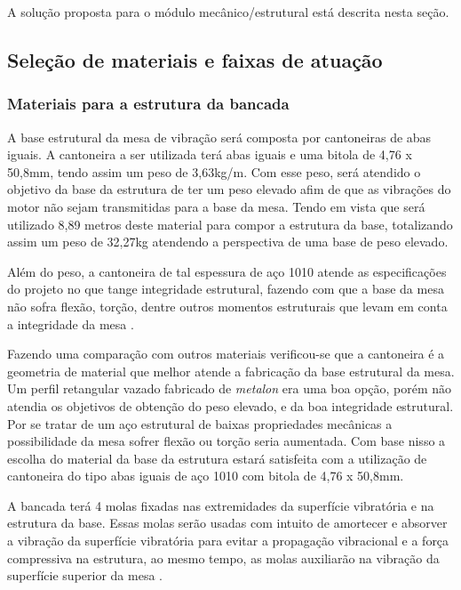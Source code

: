 \label{desenvolvimento_estrutura}

A solução proposta para o módulo mecânico/estrutural está descrita nesta seção.

\subsection*{Seleção de materiais e faixas de atuação}

\subsubsection*{\textbf{Materiais para a estrutura da bancada}}

A base estrutural da mesa de vibração será composta por cantoneiras de abas iguais. A cantoneira a ser utilizada terá abas iguais e uma bitola de 4,76 x 50,8mm, tendo assim um peso de 3,63kg/m. Com esse peso, será atendido o objetivo da base da estrutura de ter um peso elevado afim de que as vibrações do motor não sejam transmitidas para a base da mesa. Tendo em vista que será utilizado 8,89 metros deste material para compor a estrutura da base, totalizando assim um peso de 32,27kg atendendo a perspectiva de uma base de peso elevado. 

Além do peso, a cantoneira de tal espessura de aço 1010 atende as especificações do projeto no que tange integridade estrutural, fazendo com que a base da mesa não sofra flexão, torção, dentre outros momentos estruturais que levam em conta a integridade da mesa \cite{acos_continente}.

Fazendo uma comparação com outros materiais verificou-se que a cantoneira é a geometria de material que melhor atende a fabricação da base estrutural da mesa. Um perfil retangular vazado fabricado de \textit{metalon} era uma boa opção, porém não atendia os objetivos de obtenção do peso elevado, e da boa integridade estrutural. Por se tratar de um aço estrutural de baixas propriedades mecânicas a possibilidade da mesa sofrer flexão ou torção seria aumentada. Com base nisso a escolha do material da base da estrutura estará satisfeita com a utilização de cantoneira do tipo abas iguais de aço 1010 com bitola de 4,76 x 50,8mm. 

	A bancada terá 4 molas fixadas nas extremidades da superfície vibratória e na estrutura da base. Essas molas serão usadas com intuito de amortecer e absorver a vibração da superfície vibratória para evitar a propagação vibracional e a força compressiva na estrutura, ao mesmo tempo, as molas auxiliarão na vibração da superfície superior da mesa \cite{mola_santos}.
    

